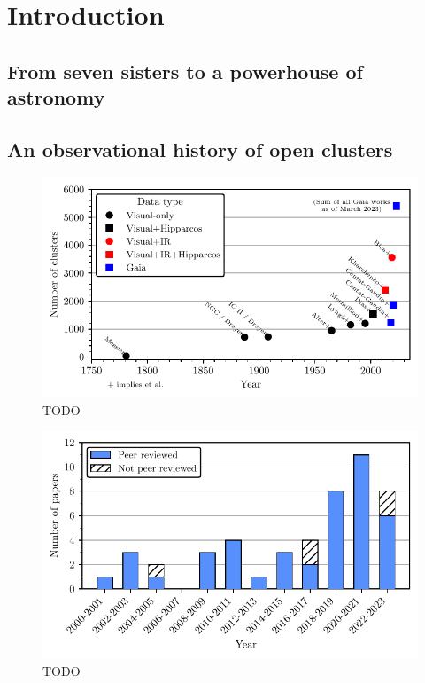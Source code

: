 %
\chapter{Introduction}
\label{sec:intro}


\section{From seven sisters to a powerhouse of astronomy}




\section{An observational history of open clusters}

\blindtext

\begin{figure}[htb]
	\includegraphics[width=\textwidth]{fig/c1/catalogues.pdf}
	\caption{TODO}
	\label{fig:intro:catalogues}
\end{figure}


\begin{figure}[htb]
	\includegraphics[width=\textwidth]{fig/c1/papers.pdf}
	\caption{TODO}
	\label{fig:intro:papers}
\end{figure}


